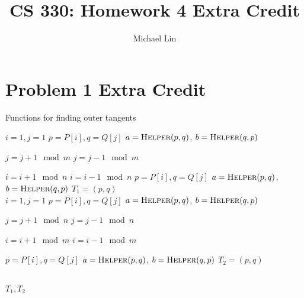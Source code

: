 \documentclass{article}
\title{CS 330: Homework 4 Extra Credit}
\author{Michael Lin}
\begin{document}
\maketitle
\section*{Problem 1 Extra Credit}
\begin{algorithm}[H]
\caption{Functions for finding outer tangents}
\begin{algorithmic}[1]
\State $i = 1, j = 1$
\State $p = P[i], q = Q[j]$
\State $a = \textsc{Helper}(p,q)$, $b = \textsc{Helper}(q,p)$

		\State $j=j+1 \mod m$
		\State $j=j-1 \mod m$
	\EndIf

		\State $i=i+1 \mod n$
		\State $i=i-1 \mod n$
	\EndIf
	\State $p = P[i], q = Q[j]$
	\State $a = \textsc{Helper}(p,q)$, $b = \textsc{Helper}(q,p)$
\EndWhile
\State $T_1 = (p,q)$
\\
\State $i = 1, j = 1$
\State $p = P[i], q = Q[j]$
\State $a = \textsc{Helper}(p,q)$, $b = \textsc{Helper}(q,p)$

			\State $j=j+1 \mod n$
			\State $j=j-1 \mod n$
		\EndIf
	
		\State $i=i+1 \mod m$
		\State $i=i-1 \mod m$
	\EndIf

	
	\State $p = P[i], q = Q[j]$
	\State $a = \textsc{Helper}(p,q)$, $b = \textsc{Helper}(q,p)$
\EndWhile
\State $T_2 = (p,q)$

\\
\State \Return $T_1, T_2$
\EndFunction
\end{algorithmic}
\end{algorithm}
\end{document}
